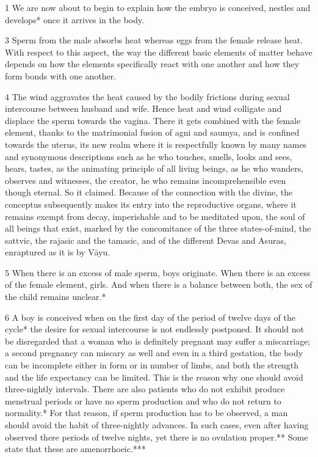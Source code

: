 \begin{translation}
\begin{tt}
    \raggedright

\item[1] We are now about to begin to explain how the embryo is conceived, 
nestles and develops* once it arrives in the body.

\item[3]Sperm from the male absorbs heat whereas eggs from the female 
release heat. With respect to this aspect, the way the different basic elements of 
matter behave depends on how the elements specifically react with one another 
and how they form bonds with one another.  

\item[4]The wind aggravates the heat caused by the bodily frictions during 
sexual intercourse between husband and wife. Hence heat and wind colligate 
and displace the sperm towards the vagina. There it gets combined with the 
female element, thanks to the matrimonial fusion of agni and saumya, and is 
confined towards the uterus, its new realm where it is respectfully known by 
many names and synonymous descriptions such as he who touches, smells, 
looks and sees, hears, tastes, as the animating principle of all living beings, as 
he who wanders, observes and witnesses, the creator, he who remains 
incomprehensible even though eternal. So it claimed. Because of the connection 
with the divine, the conceptus subsequently makes its entry into the reproductive 
organs, where it remains exempt from decay, imperishable and to be meditated 
upon, the soul of all beings that exist, marked by the concomitance of the three 
states-of-mind, the sattvic, the rajasic and the tamasic, and of the different 
Devas and Asuras, enraptured as it is by Vāyu.

\item[5]When there is an excess of male sperm, boys originate. When there is an 
excess of the female element, girls. And when there is a balance between both, 
the sex of the child remains unclear.*

\item[6]A boy is conceived when on the first day of the period of twelve days of 
the cycle* the desire for sexual intercourse is not endlessly postponed. It should 
not be disregarded that a woman who is definitely pregnant may  suffer a 
miscarriage; a second pregnancy can miscary as well and even in a third 
gestation, the body can be incomplete either in form or in number of limbs, and 
both the strength and the life expectancy can be limited. This is the reason why 
one should avoid three-nightly intervals. There are also patients who do not 
exhibit produce menstrual periods or have no sperm production and who do not 
return to normality.* For that reason, if sperm production has to be observed, a 
man should avoid the habit of three-nightly advances. In such cases, even after 
having observed there periods of twelve nights, yet there is no ovulation 
proper.** Some state that these are amenorrhoeic.*** 


\end{tt}
\end{translation}
